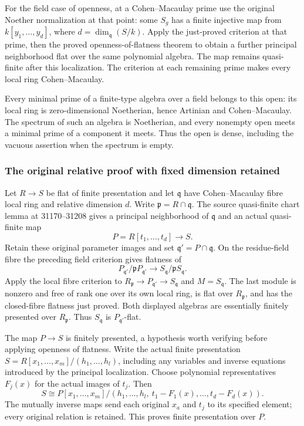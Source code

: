 For the field case of openness, at a Cohen--Macaulay prime use the original Noether normalization at that point: some \(S_g\) has a finite injective map from \(k[y_1,\ldots,y_d]\), where \(d=\dim_{\mathfrak q}(S/k)\). Apply the just-proved criterion at that prime, then the proved openness-of-flatness theorem to obtain a further principal neighborhood flat over the same polynomial algebra. The map remains quasi-finite after this localization. The criterion at each remaining prime makes every local ring Cohen--Macaulay.

Every minimal prime of a finite-type algebra over a field belongs to this open: its local ring is zero-dimensional Noetherian, hence Artinian and Cohen--Macaulay. The spectrum of such an algebra is Noetherian, and every nonempty open meets a minimal prime of a component it meets. Thus the open is dense, including the vacuous assertion when the spectrum is empty.

\subsubsection{The original relative proof with fixed dimension retained}\label{algebra-proof-040-the-original-relative-proof-with-fixed-dimension-retained}

Let \(R\to S\) be flat of finite presentation and let \(\mathfrak q\) have Cohen--Macaulay fibre local ring and relative dimension \(d\). Write \(\mathfrak p=R\cap\mathfrak q\). The source quasi-finite chart lemma at 31170--31208 gives a principal neighborhood of \(\mathfrak q\) and an actual quasi-finite map \[
P=R[t_1,\ldots,t_d]\longrightarrow S.
\] Retain these original parameter images and set \(\mathfrak q'=P\cap\mathfrak q\). On the residue-field fibre the preceding field criterion gives flatness of \[
P_{\mathfrak q'}/\mathfrak pP_{\mathfrak q'}
\longrightarrow S_{\mathfrak q}/\mathfrak pS_{\mathfrak q}.
\] Apply the local fibre criterion to \(R_{\mathfrak p}\to P_{\mathfrak q'}\to S_{\mathfrak q}\) and \(M=S_{\mathfrak q}\). The last module is nonzero and free of rank one over its own local ring, is flat over \(R_{\mathfrak p}\), and has the closed-fibre flatness just proved. Both displayed algebras are essentially finitely presented over \(R_{\mathfrak p}\). Thus \(S_{\mathfrak q}\) is \(P_{\mathfrak q'}\)-flat.

The map \(P\to S\) is finitely presented, a hypothesis worth verifying before applying openness of flatness. Write the actual finite presentation \(S=R[x_1,\ldots,x_m]/(h_1,\ldots,h_l)\), including any variables and inverse equations introduced by the principal localization. Choose polynomial representatives \(F_j(x)\) for the actual images of \(t_j\). Then \[
S\cong
P[x_1,\ldots,x_m]/
(h_1,\ldots,h_l,\ t_1-F_1(x),\ldots,t_d-F_d(x)).
\] The mutually inverse maps send each original \(x_a\) and \(t_j\) to its specified element; every original relation is retained. This proves finite presentation over \(P\).

